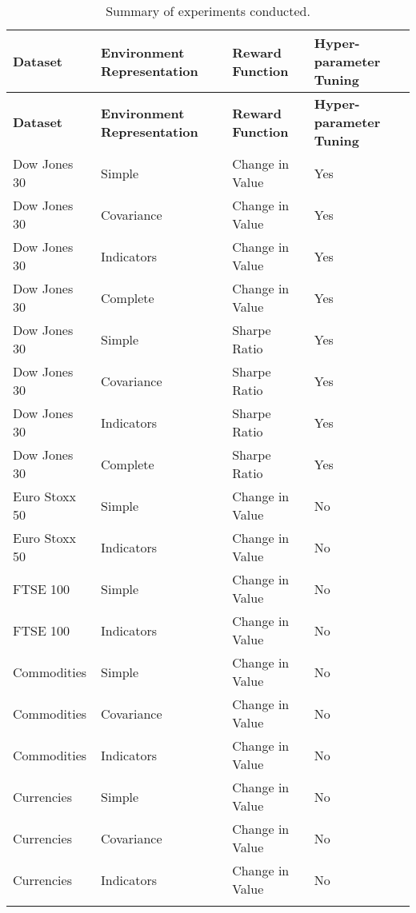 \begin{longtable}{|p{3cm}|p{3cm}|p{3.5cm}|p{3.5cm}|}
    \hline
    \textbf{Dataset} & \textbf{Environment Representation} & \textbf{Reward Function} & \textbf{Hyper-parameter Tuning} \\
    \endfirsthead

    \hline
    \textbf{Dataset} & \textbf{Environment Representation} & \textbf{Reward Function} & \textbf{Hyper-parameter Tuning} \\
    \endhead

    \endfoot
    \hline
    Dow Jones 30    & Simple         & Change in Value & Yes \\ \hline
    Dow Jones 30    & Covariance     & Change in Value & Yes \\ \hline
    Dow Jones 30    & Indicators     & Change in Value & Yes \\ \hline
    Dow Jones 30    & Complete       & Change in Value & Yes \\ \hline
    Dow Jones 30    & Simple         & Sharpe Ratio    & Yes \\ \hline
    Dow Jones 30    & Covariance     & Sharpe Ratio    & Yes \\ \hline
    Dow Jones 30    & Indicators     & Sharpe Ratio    & Yes \\ \hline
    Dow Jones 30    & Complete       & Sharpe Ratio    & Yes \\ \hline
    Euro Stoxx 50   & Simple         & Change in Value & No  \\ \hline
    Euro Stoxx 50   & Indicators     & Change in Value & No  \\ \hline
    FTSE 100        & Simple         & Change in Value & No  \\ \hline
    FTSE 100        & Indicators     & Change in Value & No  \\ \hline
    Commodities     & Simple         & Change in Value & No  \\ \hline
    Commodities     & Covariance     & Change in Value & No  \\ \hline
    Commodities     & Indicators     & Change in Value & No  \\ \hline
    Currencies      & Simple         & Change in Value & No  \\ \hline
    Currencies      & Covariance     & Change in Value & No  \\ \hline
    Currencies      & Indicators     & Change in Value & No  \\ \hline
\caption{Summary of experiments conducted.}
\label{tab:experiments-summary}
\end{longtable}
